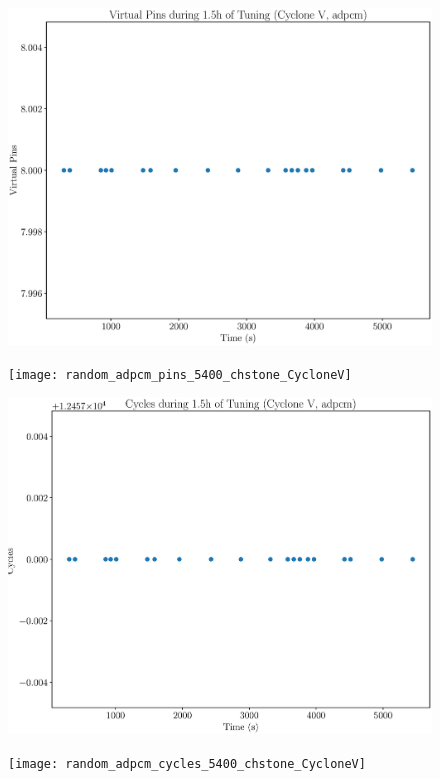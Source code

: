 \documentclass[12pt, a4paper]{article}
\begin{document}
\begin{figure}[htpb]
    \begin{minipage}{.48\textwidth}
        \includegraphics[scale=.25]{adpcm_pins_5400_chstone_CycloneV}
    \end{minipage}%
    \hfill
    \begin{minipage}{.48\textwidth}
        \texttt{[image: random\_adpcm\_pins\_5400\_chstone\_CycloneV]}
    \end{minipage}%

    \begin{minipage}{.48\textwidth}
        \includegraphics[scale=.25]{adpcm_cycles_5400_chstone_CycloneV}
    \end{minipage}%
    \hfill
    \begin{minipage}{.48\textwidth}
        \texttt{[image: random\_adpcm\_cycles\_5400\_chstone\_CycloneV]}
    \end{minipage}%
\end{figure}
\end{document}
